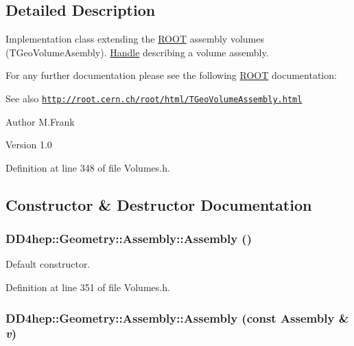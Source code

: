 \subsection{Detailed Description}
Implementation class extending the \hyperlink{namespace_r_o_o_t}{ROOT} assembly volumes (TGeoVolumeAsembly). \hyperlink{class_d_d4hep_1_1_handle}{Handle} describing a volume assembly.

For any further documentation please see the following \hyperlink{namespace_r_o_o_t}{ROOT} documentation: \begin{DoxySeeAlso}{See also}
\href{http://root.cern.ch/root/html/TGeoVolumeAssembly.html}{\tt http://root.cern.ch/root/html/TGeoVolumeAssembly.html}
\end{DoxySeeAlso}
\begin{DoxyAuthor}{Author}
M.Frank 
\end{DoxyAuthor}
\begin{DoxyVersion}{Version}
1.0 
\end{DoxyVersion}


Definition at line 348 of file Volumes.h.

\subsection{Constructor \& Destructor Documentation}
\hypertarget{class_d_d4hep_1_1_geometry_1_1_assembly_a18347f291bd562b3ef99fe05f043b03c}{
\subsubsection[{Assembly}]{\setlength{\rightskip}{0pt plus 5cm}DD4hep::Geometry::Assembly::Assembly ()}}
\label{class_d_d4hep_1_1_geometry_1_1_assembly_a18347f291bd562b3ef99fe05f043b03c}


Default constructor. 

Definition at line 351 of file Volumes.h.\hypertarget{class_d_d4hep_1_1_geometry_1_1_assembly_a8eb0042bd057b80ad9e4e3e716de4399}{
\subsubsection[{Assembly}]{\setlength{\rightskip}{0pt plus 5cm}DD4hep::Geometry::Assembly::Assembly (const {\bf Assembly} \& {\em v})}}
\label{class_d_d4hep_1_1_geometry_1_1_assembly_a8eb0042bd057b80ad9e4e3e716de4399}


